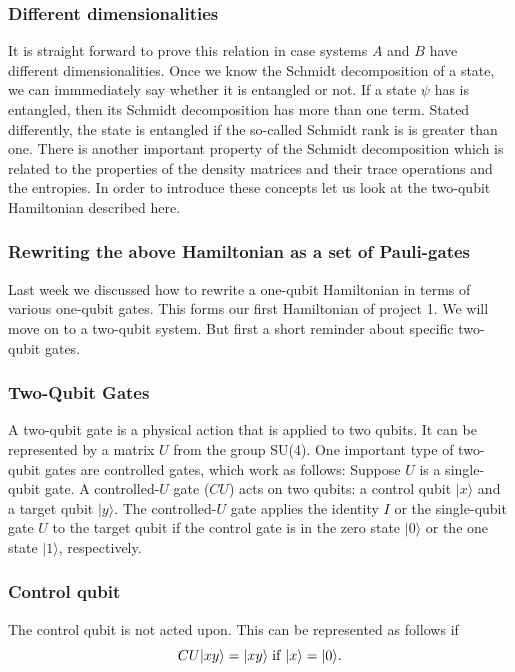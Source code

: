 \documentclass{beamer}
\begin{document}
\begin{frame}
\frametitle{Different dimensionalities}

It is straight forward to prove this relation in case systems $A$ and
$B$ have different dimensionalities.  Once we know the Schmidt
decomposition of a state, we can immmediately say whether it is
entangled or not. If a state $\psi$ has is entangled, then its Schmidt
decomposition has more than one term. Stated differently, the state is
entangled if the so-called Schmidt rank is is greater than one.  There
is another important property of the Schmidt decomposition which is
related to the properties of the density matrices and their trace
operations and the entropies. In order to introduce these concepts let
us look at the two-qubit Hamiltonian described here.
\end{frame}

\begin{frame}
\frametitle{Rewriting the above Hamiltonian as a set of Pauli-gates}

Last week we discussed how to rewrite a one-qubit Hamiltonian in terms
of various one-qubit gates.  This forms our first Hamiltonian of
project 1. We will move on to a two-qubit system.  But first a short
reminder about specific two-qubit gates.
\end{frame}

\begin{frame}
\frametitle{Two-Qubit Gates}

A two-qubit gate is a physical action that is applied to two
qubits. It can be represented by a matrix $U$ from the group
SU(4). One important type of two-qubit gates are controlled gates,
which work as follows: Suppose $U$ is a single-qubit gate. A
controlled-$U$ gate ($CU$) acts on two qubits: a control qubit
$\vert x \rangle $ and a target qubit $\vert y \rangle $. The controlled-$U$ gate
applies the identity $I$ or the single-qubit gate $U$ to the target
qubit if the control gate is in the zero state $\vert 0\rangle$ or the one
state $\vert 1\rangle$, respectively.
\end{frame}

\begin{frame}
\frametitle{Control qubit}

The control qubit is not acted
upon. This can be represented as follows if
\[CU\vert xy\rangle=
\vert xy\rangle \hspace{0.1cm} \mathrm{if} \hspace{0.1cm}  \vert x \rangle =\vert 0\rangle.
\]
\end{frame}
\end{document}
